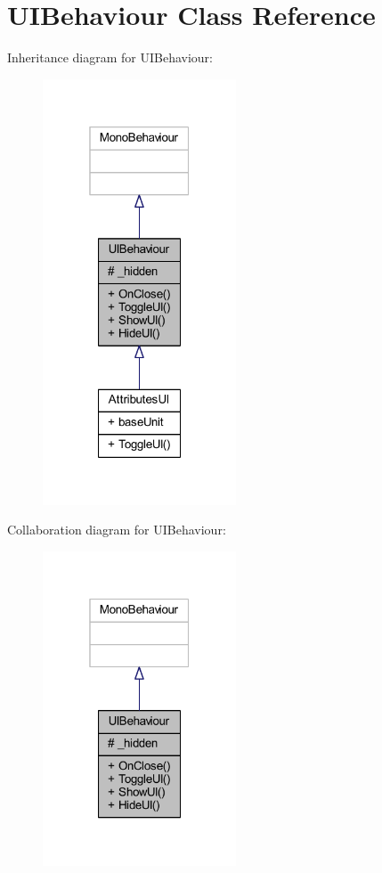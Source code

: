 \hypertarget{class_u_i_behaviour}{}\section{U\+I\+Behaviour Class Reference}
\label{class_u_i_behaviour}


Inheritance diagram for U\+I\+Behaviour\+:\nopagebreak
\begin{figure}[H]
\begin{center}
\leavevmode
\includegraphics[width=163pt]{class_u_i_behaviour__inherit__graph}
\end{center}
\end{figure}


Collaboration diagram for U\+I\+Behaviour\+:\nopagebreak
\begin{figure}[H]
\begin{center}
\leavevmode
\includegraphics[width=163pt]{class_u_i_behaviour__coll__graph}
\end{center}
\end{figure}
